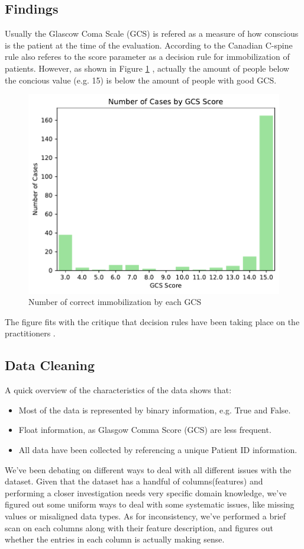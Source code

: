 \documentclass[10pt,letterpaper]{article}
\begin{document}
\subsection{Findings}
Usually the Glascow Coma Scale (GCS) is refered as a measure of how conscious is the patient at the time of the evaluation. According to the Canadian C-spine rule \cite{stiell2001canadian} also referes to the score parameter as a decision rule for immobilization of patients. However, as shown in Figure \ref{fig:gcs-target} , actually the amount of people below the concious value (e.g. 15) is below the amount of people with good GCS.

\begin{figure}[H]
    \centering
    \includegraphics[width=0.5\linewidth]{plots/cases_by_gcs.pdf}
    \caption{Number of correct immobilization by each GCS}
    \label{fig:gcs-target}
\end{figure}

The figure fits with the critique that decision rules have been taking place on the practitioners \cite{michaleff2012accuracy}. 


\subsection{Data Cleaning}

A quick overview of the characteristics of the data shows that:
\begin{itemize}
    \item Most of the data is represented by binary information, e.g. True and False. 
    \item Float information, as Glasgow Comma Score (GCS) are less frequent. 
    \item All data have been collected by referencing a unique Patient ID information.
\end{itemize}

We've been debating on different ways to deal with all different issues with the dataset. Given that the dataset has a handful of columns(features) and performing a closer investigation needs very specific domain knowledge, we've figured out some uniform ways to deal with some systematic issues, like missing values or misaligned data types. As for inconsistency, we've performed a brief scan on each columns along with their feature description, and figures out whether the entries in each column is actually making sense.
\end{document}
